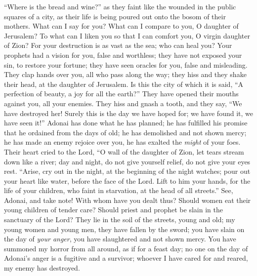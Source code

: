 \begin{biblechapter}
“Where is the bread and wine?” 
as they faint like the wounded 
in the public squares of a city, 
as their life is being poured out 
onto the bosom of their mothers.
\verse What can I say for you? What can I compare to you, 
O daughter of Jerusalem? 
To what can I liken you so that I can comfort you, 
O virgin daughter of Zion? 
For your destruction is as vast as the sea; 
who can heal you?
\verse Your prophets had a vision for you, 
false and worthless; 
they have not exposed your sin, 
to restore your fortune; 
they have seen oracles for you, 
false and misleading.
\verse They clap hands over you, 
all who pass along the way; 
they hiss and they shake their head, 
at the daughter of Jerusalem. 
Is this the city of which it is said, 
“A perfection of beauty, a joy for all the earth?”
\verse They have opened their mouths against you, 
all your enemies. 
They hiss and gnash a tooth, 
and they say, “We have destroyed her! 
Surely this is the day we have hoped for; 
we have found it, we have seen it!”
\verse Adonai has done what he has planned; 
he has fulfilled his promise 
that he ordained from the days of old; 
he has demolished and not shown mercy; 
he has made an enemy rejoice over you, 
he has exalted the \textit{might} of your foes.
\verse Their heart cried to the Lord, 
“O wall of the daughter of Zion, 
let tears stream down like a river; 
day and night, 
do not give yourself relief, 
do not give your eyes rest.
\verse “Arise, cry out in the night, 
at the beginning of the night watches; 
pour out your heart like water, 
before the face of the Lord. 
Lift to him your hands, 
for the life of your children, 
who faint in starvation, 
at the head of all streets.”
\verse See, Adonai, and take note! 
With whom have you dealt thus? 
Should women eat their young 
children of tender care? 
Should priest and prophet be slain 
in the sanctuary of the Lord?
\verse They lie in the soil of the streets, 
young and old; 
my young women and young men, 
they have fallen by the sword; 
you have slain on the day of \textit{your anger}, 
you have slaughtered and not shown mercy.
\verse You have summoned my horror from all around, 
as if for a feast day; 
no one on the day of Adonai’s anger 
is a fugitive and a survivor; 
whoever I have cared for and reared, 
my enemy has destroyed.
\end{biblechapter}


